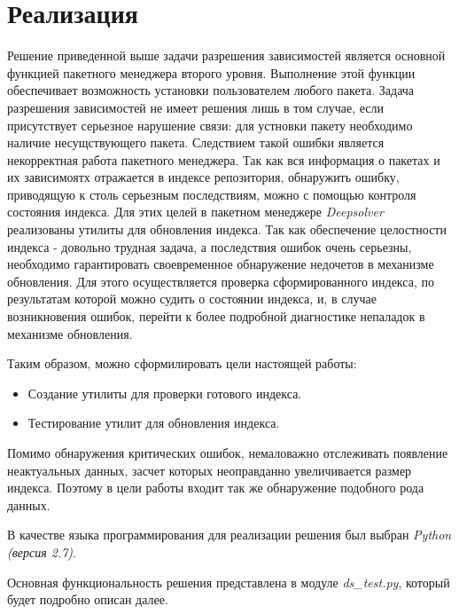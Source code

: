 \section{Реализация}
Решение приведенной выше задачи разрешения зависимостей является основной
функцией пакетного менеджера второго уровня. Выполнение этой функции обеспечивает
возможность установки пользователем любого пакета. Задача разрешения
зависимостей не имеет решения лишь в том случае, если присутствует
серьезное нарушение связи: для устновки пакету необходимо наличие
несущствующего пакета. Следствием такой ошибки является некорректная 
работа пакетного менеджера. Так как вся информация о пакетах и их 
зависимоятх отражается в индексе репозитория, обнаружить ошибку,
приводящую к столь серьезным последствиям, можно с помощью
контроля состояния индекса. Для этих целей в пакетном менеджере 
\textit{Deepsolver} реализованы утилиты для обновления индекса. 
Так как обеспечение целостности индекса - довольно трудная задача, а 
последствия ошибок очень серьезны, необходимо гарантировать своевременное
обнаружение недочетов в механизме обновления. Для этого осуществляется
проверка сформированного индекса, по результатам которой можно
судить о состоянии индекса, и, в случае возникновения ошибок, перейти
к более подробной диагностике непаладок в механизме обновления. 

Таким образом, можно сформилировать цели настоящей работы:
\begin{itemize}
\item{Создание утилиты для проверки готового индекса.}
\item{Тестирование утилит для обновления индекса.}
\end{itemize}

Помимо обнаружения критических ошибок, немаловажно отслеживать 
появление неактуальных данных, засчет которых неоправданно 
увеличивается размер индекса. Поэтому в цели работы входит
так же обнаружение подобного рода данных.

В качестве языка программирования для реализации решения был выбран \textit{Python (версия 2.7)}.

Основная функциональность решения представлена в модуле \textit{ds\_test.py}, который
будет подробно описан далее.

